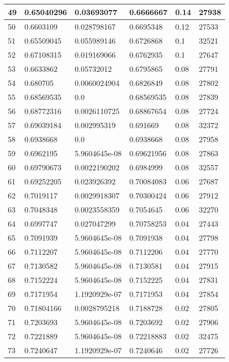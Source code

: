 \begin{longtable}{|l|l|l|l|l|l|}
49 & 0.65040296 & 0.03693077 & 0.6666667 & 0.14 & 27938 \\ \hline 
50 & 0.6603109 & 0.028798167 & 0.6695348 & 0.12 & 27533 \\ \hline 
51 & 0.65509045 & 0.055989146 & 0.6726868 & 0.1 & 32521 \\ \hline 
52 & 0.67108315 & 0.019169066 & 0.6762935 & 0.1 & 27647 \\ \hline 
53 & 0.6633862 & 0.05732012 & 0.6795865 & 0.08 & 27791 \\ \hline 
54 & 0.680705 & 0.0060024904 & 0.6826849 & 0.08 & 27802 \\ \hline 
55 & 0.68569535 & 0.0 & 0.68569535 & 0.08 & 27839 \\ \hline 
56 & 0.68772316 & 0.0026110725 & 0.68867654 & 0.08 & 27724 \\ \hline 
57 & 0.69039184 & 0.002995319 & 0.691669 & 0.08 & 32372 \\ \hline 
58 & 0.6938668 & 0.0 & 0.6938668 & 0.08 & 27958 \\ \hline 
59 & 0.6962195 & 5.9604645e-08 & 0.69621956 & 0.08 & 27863 \\ \hline 
60 & 0.69790673 & 0.0022190202 & 0.6984999 & 0.08 & 32557 \\ \hline 
61 & 0.69252205 & 0.023926392 & 0.70084083 & 0.06 & 27687 \\ \hline 
62 & 0.7019117 & 0.0029918307 & 0.70300424 & 0.06 & 27912 \\ \hline 
63 & 0.7048348 & 0.0023558359 & 0.7054645 & 0.06 & 32270 \\ \hline 
64 & 0.6997747 & 0.027047299 & 0.70758253 & 0.04 & 27443 \\ \hline 
65 & 0.7091939 & 5.9604645e-08 & 0.7091938 & 0.04 & 27798 \\ \hline 
66 & 0.7112207 & 5.9604645e-08 & 0.7112206 & 0.04 & 27770 \\ \hline 
67 & 0.7130582 & 5.9604645e-08 & 0.7130581 & 0.04 & 27915 \\ \hline 
68 & 0.7152224 & 5.9604645e-08 & 0.7152225 & 0.04 & 27831 \\ \hline 
69 & 0.7171954 & 1.1920929e-07 & 0.7171953 & 0.04 & 27854 \\ \hline 
70 & 0.71804166 & 0.0028795218 & 0.7188728 & 0.02 & 27805 \\ \hline 
71 & 0.7203693 & 5.9604645e-08 & 0.7203692 & 0.02 & 27906 \\ \hline 
72 & 0.7221889 & 5.9604645e-08 & 0.72218883 & 0.02 & 32475 \\ \hline 
73 & 0.7240647 & 1.1920929e-07 & 0.7240646 & 0.02 & 27726 \\ \hline 

\end{longtable}
